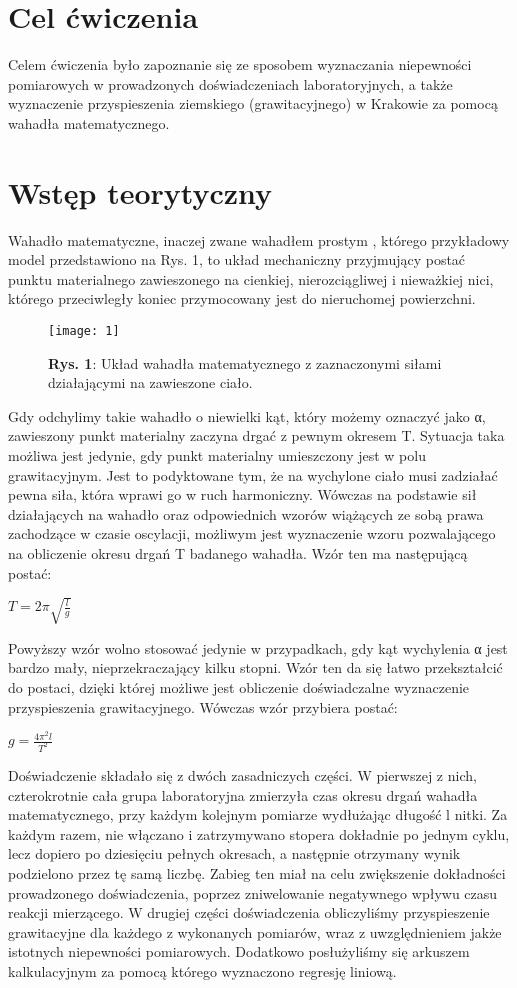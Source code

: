 \documentclass[12pt]{article}
\begin{document}
\tableofcontents \newpage
\section{Cel ćwiczenia}
Celem ćwiczenia było zapoznanie się ze sposobem wyznaczania niepewności pomiarowych w prowadzonych doświadczeniach laboratoryjnych, a także wyznaczenie przyspieszenia ziemskiego (grawitacyjnego) w Krakowie za pomocą wahadła matematycznego. 
\section{Wstęp teorytyczny}
Wahadło matematyczne, inaczej zwane wahadłem prostym , którego przykładowy model przedstawiono na Rys. 1, to układ mechaniczny przyjmujący postać punktu materialnego zawieszonego na cienkiej, nierozciągliwej i nieważkiej nici, którego przeciwległy koniec przymocowany jest do nieruchomej powierzchni.
\begin{figure}[H]
\centering
\texttt{[image: 1]}
\caption*{\textbf{Rys. 1}: Układ wahadła matematycznego z zaznaczonymi siłami działającymi na zawieszone ciało.}
\end{figure}
\noindent Gdy odchylimy takie wahadło o niewielki kąt, który możemy oznaczyć jako α, zawieszony punkt materialny zaczyna drgać z pewnym okresem T. Sytuacja taka możliwa jest jedynie, gdy punkt materialny umieszczony jest w polu grawitacyjnym. Jest to podyktowane tym, że na wychylone ciało musi zadziałać pewna siła, która wprawi go w ruch harmoniczny. Wówczas na podstawie sił działających na wahadło oraz odpowiednich wzorów wiążących ze sobą prawa zachodzące w czasie oscylacji, możliwym jest wyznaczenie wzoru pozwalającego na obliczenie okresu drgań T badanego wahadła. Wzór ten ma następującą postać:
\begin{center}
\LARGE $ T = 2\pi\sqrt{\frac{l}{g}} $
\end{center}
\newpage
\noindent Powyższy wzór wolno stosować jedynie w przypadkach, gdy kąt wychylenia α jest bardzo mały, nieprzekraczający kilku stopni. Wzór ten da się łatwo przekształcić do postaci, dzięki której możliwe jest obliczenie doświadczalne wyznaczenie przyspieszenia grawitacyjnego. Wówczas wzór przybiera postać:
\begin{center}
\LARGE $ g = \frac{4{\pi^2}l}{T^2} $
\end{center}
Doświadczenie składało się z dwóch zasadniczych części. W pierwszej z nich, czterokrotnie cała grupa laboratoryjna zmierzyła czas okresu drgań wahadła matematycznego, przy każdym kolejnym pomiarze wydłużając długość l nitki. Za każdym razem, nie włączano i zatrzymywano stopera dokładnie po jednym cyklu, lecz dopiero po dziesięciu pełnych okresach, a następnie otrzymany wynik podzielono przez tę samą liczbę. Zabieg ten miał na celu zwiększenie dokładności prowadzonego doświadczenia, poprzez zniwelowanie negatywnego wpływu czasu reakcji mierzącego.
W drugiej części doświadczenia obliczyliśmy przyspieszenie grawitacyjne dla każdego z wykonanych pomiarów, wraz z uwzględnieniem jakże istotnych niepewności pomiarowych. Dodatkowo posłużyliśmy się arkuszem kalkulacyjnym za pomocą którego wyznaczono regresję liniową.
\end{document}
